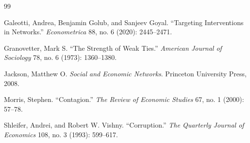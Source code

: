 \documentclass[11pt,letterpaper]{article}
\begin{document}
\begingroup
\small
\setlength{\itemsep}{0pt}
\setlength{\parskip}{0pt}
\begin{thebibliography}{99}

Galeotti, Andrea, Benjamin Golub, and Sanjeev Goyal. ``Targeting Interventions in Networks.'' \textit{Econometrica} 88, no. 6 (2020): 2445--2471.

Granovetter, Mark S. ``The Strength of Weak Ties.'' \textit{American Journal of Sociology} 78, no. 6 (1973): 1360--1380.

Jackson, Matthew O. \textit{Social and Economic Networks}. Princeton University Press, 2008.

Morris, Stephen. ``Contagion.'' \textit{The Review of Economic Studies} 67, no. 1 (2000): 57--78.

Shleifer, Andrei, and Robert W. Vishny. ``Corruption.'' \textit{The Quarterly Journal of Economics} 108, no. 3 (1993): 599--617.

\end{thebibliography}
\endgroup
\end{document}
